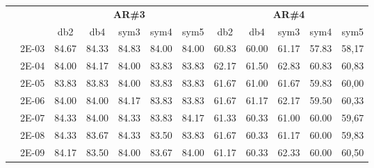 \begin{table}[H]
\begin{tabular}{|c|c|c c c c c|c c c c c|}
\cline{3-12}
\multicolumn{2}{c}{} & \multicolumn{5}{|c|}{\textbf{AR\#3}}  & \multicolumn{5}{c|}{\textbf{AR\#4}} \\\cline{3-12}
\multicolumn{2}{c}{}  & \multicolumn{1}{|c}{db2} & db4 & sym3 & sym4 & sym5 & db2 & db4& sym3 & sym4 & sym5 \\\hline
\multicolumn{1}{|c|}{ \multirow{6}{*}{\rotatebox[origin=c]{90}{\textbf{Gamma}}} }
&2E-03&	84.67&	84.33&	84.83&	84.00&	84.00	&60.83 &	60.00&	61.17&	57.83&	58,17	\\\cline{2-12}
&2E-04&	84.00&	84.17&	84.00&	83.83&	83.83	&62.17 &	61.50&	62.83&	60.83&	60,83	\\\cline{2-12}
&2E-05&	83.83&	83.83&	84.00&	83.83&	83.83	&61.67 &	61.00&	61.67&	59.83&	60,00	\\\cline{2-12}
&2E-06&	84.00&	84.00&	84.17&	83.83&	83.83	&61.67 &	61.17&	62.17&	59.50&	60,33	\\\cline{2-12}
&2E-07&	84.33&	84.00&	84.33&	83.83&	84.17	&61.33 &	60.33&	61.00&	60.00&	59,67	\\\cline{2-12}
&2E-08&	84.33&	83.67&	84.33&	83.50&	83.83	&61.67 &	60.33&	61.17&	60.00&	59,83	\\\cline{2-12}
&2E-09&	84.17&	83.50&	84.00&	83.67&	84.00	&61.17 &	60.33&	62.33&	60.00&	60,50	
	
	
	
\\\midrule
\end{tabular}
\end{table}




